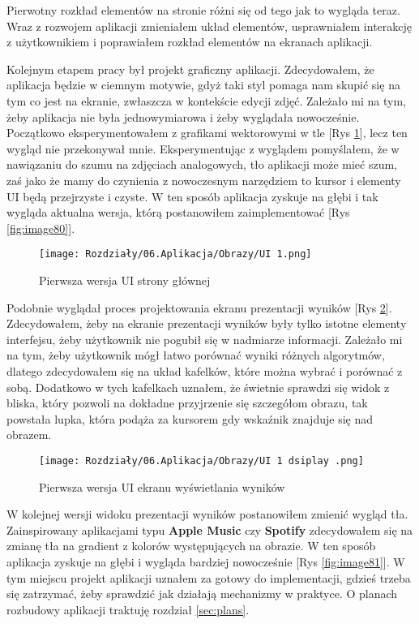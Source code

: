 Pierwotny rozkład elementów na stronie różni się od tego jak to wygląda teraz. Wraz z rozwojem aplikacji zmieniałem układ elementów, usprawniałem interakcję z użytkownikiem i poprawiałem rozkład elementów na ekranach aplikacji.

Kolejnym etapem pracy był projekt graficzny aplikacji. Zdecydowałem, że aplikacja będzie w ciemnym motywie, gdyż taki styl pomaga nam skupić się na tym co jest na ekranie, zwłaszcza w kontekście edycji zdjęć. Zależało mi na tym, żeby aplikacja nie była jednowymiarowa i żeby wyglądała nowocześnie. Początkowo eksperymentowałem z grafikami wektorowymi w tle [Rys \ref{fig:image85}], lecz ten wygląd nie przekonywał mnie. Eksperymentując z wyglądem pomyślałem, że w nawiązaniu do szumu na zdjęciach analogowych, tło aplikacji może mieć szum, zaś jako że mamy do czynienia z nowoczesnym narzędziem to kursor i elementy UI będą przejrzyste i czyste. W ten sposób aplikacja zyskuje na głębi i tak wygląda aktualna wersja, którą postanowiłem zaimplementować [Rys \ref{fig:image80}].

\begin{figure}[H]
    \centering
    \texttt{[image: Rozdziały/06.Aplikacja/Obrazy/UI 1.png]}  
    \caption{Pierwsza wersja UI strony głównej}
    \label{fig:image85}
\end{figure}

Podobnie wyglądał proces projektowania ekranu prezentacji wyników [Rys \ref{fig:image86}]. Zdecydowałem, żeby na ekranie prezentacji wyników były tylko istotne elementy interfejsu, żeby użytkownik nie pogubił się w nadmiarze informacji. Zależało mi na tym, żeby użytkownik mógł łatwo porównać wyniki różnych algorytmów, dlatego zdecydowałem się na układ kafelków, które można wybrać i porównać z sobą. Dodatkowo w tych kafelkach uznałem, że świetnie sprawdzi się widok z bliska, który pozwoli na dokładne przyjrzenie się szczegółom obrazu, tak powstała lupka, która podąża za kursorem gdy wskaźnik znajduje się nad obrazem. 


\begin{figure}[H]
    \centering
    \texttt{[image: Rozdziały/06.Aplikacja/Obrazy/UI 1 dsiplay .png]}  
    \caption{Pierwsza wersja UI ekranu wyświetlania wyników}
    \label{fig:image86}
\end{figure}

W kolejnej wersji widoku prezentacji wyników postanowiłem zmienić wygląd tła. Zainspirowany aplikacjami typu \textbf{Apple Music} czy \textbf{Spotify} zdecydowałem się na zmianę tła na gradient z kolorów występujących na obrazie. W ten sposób aplikacja zyskuje na głębi i wygląda bardziej nowocześnie [Rys \ref{fig:image81}]. W tym miejscu projekt aplikacji uznałem za gotowy do implementacji, gdzieś trzeba się zatrzymać, żeby sprawdzić jak działają mechanizmy w praktyce. O planach rozbudowy aplikacji traktuję rozdział \ref{sec:plans}.



